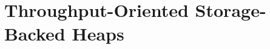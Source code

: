 \begingroup {}

\chapter{Throughput-Oriented Storage-Backed Heaps}
\label{chapter:teraheap}


%

%

%

%

%

%

%

%
% 
%


\clearpage \endgroup

